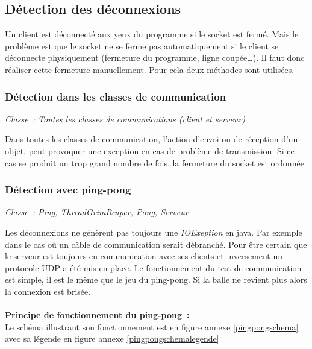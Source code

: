 \documentclass[a4paper, titlepage]{livret}
\begin{document}
  \subsection{Détection des déconnexions}
    Un client est déconnecté aux yeux du programme si le socket est fermé. Mais le problème est que le socket ne se ferme pas automatiquement si le client se déconnecte physiquement (fermeture du programme, ligne coupée…). Il faut donc réaliser cette fermeture manuellement. Pour cela deux méthodes sont utilisées.
    
  \subsubsection{Détection dans les classes de communication}
    \begin{center}
    \textit{Classe : Toutes les classes de communications (client et serveur)}
    \end{center}
      Dans toutes les classes de communication, l’action d’envoi ou de réception d’un objet, peut provoquer une exception en cas de problème de transmission. Si ce cas se produit un trop grand nombre de fois, la fermeture du socket est ordonnée.
    
    \subsubsection{Détection avec ping-pong}
    \begin{center}
    \textit{Classe : Ping, ThreadGrimReaper, Pong, Serveur}
    \end{center}
      Les déconnexions ne génèrent pas toujours une \textit{IOExeption} en java. Par exemple dans le cas où un câble de communication serait débranché. Pour être certain que le serveur est toujours en communication avec ses clients et inversement un protocole UDP a été mis en place. Le fonctionnement du test de communication est simple, il est le même que le jeu du ping-pong. Si la balle ne revient plus alors la connexion est brisée.
\\
\\
\textbf{Principe de fonctionnement du ping-pong :}
\\
Le schéma illustrant son fonctionnement est en figure annexe \ref{pingpongschema} avec sa légende en figure annexe \ref{pingpongschemalegende}
\end{document}
